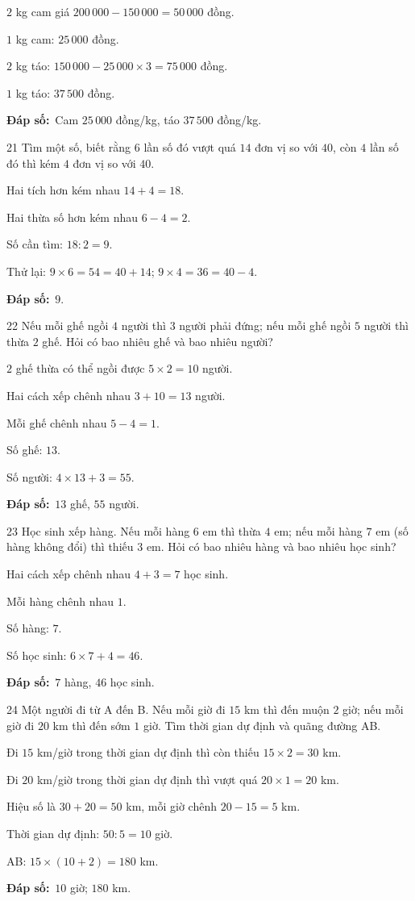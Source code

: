 \documentclass[11pt]{article}
\newif\ifsol \solfalse
\providecommand{\AnsWord}{Đáp số}
\newcommand{\dapso}[1]{\par\textbf{\AnsWord:}\ #1}
\newcommand{\probsol}[1]{%
  \begin{lrbox}{\solmeasure}\begin{minipage}{\dimexpr\linewidth-24pt\relax}#1\end{minipage}\end{lrbox}%
  \ifsol
    \begin{solbox}#1\end{solbox}%
  \else
    \setlength{\solht}{\dimexpr\ht\solmeasure+\dp\solmeasure+0.85cm\relax}%
    \ifdim\solht<1.35cm\setlength{\solht}{1.35cm}\fi
    \begin{tcolorbox}[colback=white,colframe=Line,boxrule=0.8pt,arc=5pt,
      left=8pt,right=8pt,top=4pt,bottom=4pt,height=\solht]{\footnotesize\color{Slate}\itshape\WorkWord}\end{tcolorbox}%
  \fi}
\newcommand{\gap}{\vspace{0.3cm}}
\def\WorkWord{Bài làm:}
\def\AnsWord{Đáp số}
\begin{document}
\probsol{
$2$ kg cam giá $200\,000-150\,000=50\,000$ đồng.\par $1$ kg cam: $25\,000$ đồng.\par $2$ kg táo: $150\,000-25\,000\times3=75\,000$ đồng.\par $1$ kg táo: $37\,500$ đồng.
\dapso{Cam $25\,000$ đồng/kg, táo $37\,500$ đồng/kg.}}
\gap
\begin{probbox}{21}{\relax}
Tìm một số, biết rằng $6$ lần số đó vượt quá $14$ đơn vị so với $40$, còn $4$ lần số đó thì kém $4$ đơn vị so với $40$.
\end{probbox}
\probsol{
Hai tích hơn kém nhau $14+4=18$.\par Hai thừa số hơn kém nhau $6-4=2$.\par Số cần tìm: $18:2=9$.\par Thử lại: $9\times6=54=40+14$; $9\times4=36=40-4$.
\dapso{$9$.}}
\gap
\begin{probbox}{22}{\relax}
Nếu mỗi ghế ngồi $4$ người thì $3$ người phải đứng; nếu mỗi ghế ngồi $5$ người thì thừa $2$ ghế. Hỏi có bao nhiêu ghế và bao nhiêu người?
\end{probbox}
\probsol{
$2$ ghế thừa có thể ngồi được $5\times2=10$ người.\par Hai cách xếp chênh nhau $3+10=13$ người.\par Mỗi ghế chênh nhau $5-4=1$.\par Số ghế: $13$.\par Số người: $4\times13+3=55$.
\dapso{$13$ ghế, $55$ người.}}
\gap
\begin{probbox}{23}{\relax}
Học sinh xếp hàng. Nếu mỗi hàng $6$ em thì thừa $4$ em; nếu mỗi hàng $7$ em (số hàng không đổi) thì thiếu $3$ em. Hỏi có bao nhiêu hàng và bao nhiêu học sinh?
\end{probbox}
\probsol{
Hai cách xếp chênh nhau $4+3=7$ học sinh.\par Mỗi hàng chênh nhau $1$.\par Số hàng: $7$.\par Số học sinh: $6\times7+4=46$.
\dapso{$7$ hàng, $46$ học sinh.}}
\gap
\begin{probbox}{24}{\relax}
Một người đi từ A đến B. Nếu mỗi giờ đi $15$ km thì đến muộn $2$ giờ; nếu mỗi giờ đi $20$ km thì đến sớm $1$ giờ. Tìm thời gian dự định và quãng đường AB.
\end{probbox}
\probsol{
Đi $15$ km/giờ trong thời gian dự định thì còn thiếu $15\times2=30$ km.\par Đi $20$ km/giờ trong thời gian dự định thì vượt quá $20\times1=20$ km.\par Hiệu số là $30+20=50$ km, mỗi giờ chênh $20-15=5$ km.\par Thời gian dự định: $50:5=10$ giờ.\par AB: $15\times(10+2)=180$ km.
\dapso{$10$ giờ; $180$ km.}}
\end{document}
